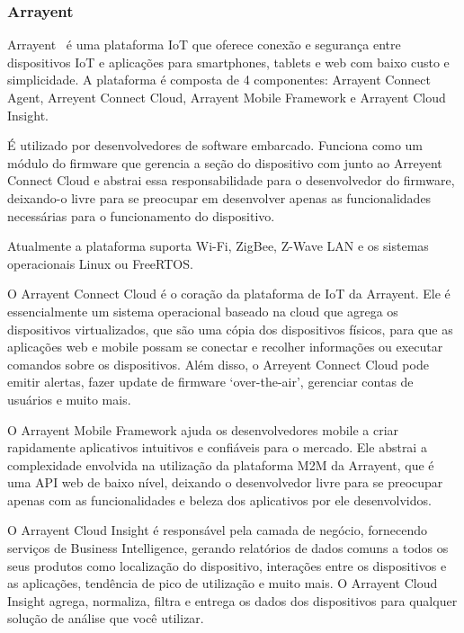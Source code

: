 \subsubsection{Arrayent}
Arrayent~\cite{arrayent} é uma plataforma IoT que oferece conexão e segurança entre dispositivos IoT e aplicações
para  smartphones, tablets e web com baixo custo e simplicidade. A plataforma é composta de 4 componentes:
Arrayent Connect Agent, Arreyent Connect Cloud, Arrayent Mobile Framework e Arrayent Cloud Insight.

É utilizado por desenvolvedores de software embarcado. Funciona como um módulo do firmware que gerencia a
seção do dispositivo com junto ao Arreyent Connect Cloud e abstrai essa responsabilidade para o desenvolvedor
do firmware, deixando-o livre para se preocupar em desenvolver apenas as funcionalidades necessárias para o
funcionamento do dispositivo.

Atualmente a plataforma suporta Wi-Fi, ZigBee, Z-Wave LAN e os sistemas operacionais Linux ou FreeRTOS.

O Arrayent Connect Cloud é o coração da plataforma de IoT da Arrayent. Ele é essencialmente um sistema
operacional baseado na cloud que agrega os dispositivos virtualizados, que são uma cópia dos dispositivos
físicos, para que as aplicações web e mobile possam se conectar e recolher informações ou executar comandos
sobre os dispositivos. Além disso, o Arreyent Connect Cloud pode emitir alertas, fazer update de firmware
\lq over-the-air\rq, gerenciar contas de usuários e muito mais.

O Arrayent Mobile Framework ajuda os desenvolvedores mobile a criar rapidamente aplicativos intuitivos e
confiáveis para o mercado. Ele abstrai a complexidade envolvida na utilização da plataforma M2M da Arrayent,
que é uma API web de baixo nível, deixando o desenvolvedor livre para se preocupar apenas com as funcionalidades
e beleza dos aplicativos por ele desenvolvidos.

O Arrayent Cloud Insight é responsável pela camada de negócio, fornecendo serviços de Business Intelligence,
gerando relatórios de dados comuns a todos os seus produtos como localização do dispositivo, interações entre
os dispositivos e as aplicações, tendência de pico de utilização e muito mais. O Arrayent Cloud Insight agrega,
normaliza, filtra e entrega os dados dos dispositivos para qualquer solução de análise que você utilizar.

